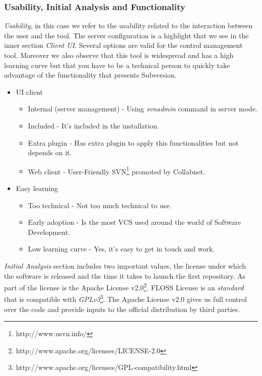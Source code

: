 \documentclass[11pt]{scrartcl}
\begin{document}
\subsubsection{Usability, Initial Analysis and Functionality}

\par \emph{Usability}, in this case we refer to the usability related to the interaction between the user and the tool. The server configuration is a highlight that we see in the inner section \emph{Client UI}. Several options are valid for the control management tool. Moreover we also observe that this tool is widespread and has a high learning curve but that you have to be a technical person to quickly take advantage of the functionality that presents Subversion.

\begin{itemize}
    \item UI client
	    \begin{itemize}
            \item Internal (server management) - Using \emph{svnadmin} command in server mode.
            \item Included - It's included in the installation.
            \item Extra plugin - Has extra plugin to apply this functionalities but not depends on it.
            \item Web client - User-Friendly SVN\footnote{http://www.usvn.info/} promoted by Collabnet.
        \end{itemize}

    \item Easy learning
	    \begin{itemize}
            \item Too technical - Not too much technical to use.
            \item Early adoption - Is the most VCS used around the world of Software Development.
            \item Low learning curve - Yes, it's easy to get in touch and work.
        \end{itemize}
\end{itemize}

\par \emph{Initial Analysis} section includes two important values​​, the license under which the software is released and the time it takes to launch the first repository. As part of the license is the Apache License v2.0\footnote{http://www.apache.org/licenses/LICENSE-2.0}. FLOSS License is an \emph{standard} that is compatible with \emph{GPLv3}\footnote{http://www.apache.org/licenses/GPL-compatibility.html}. The Apache License v2.0 gives us full control over the code and provide inputs to the official distribution by third parties.
\end{document}
